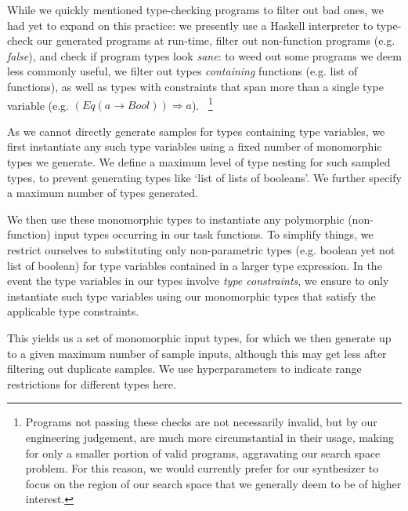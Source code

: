 \documentclass{article}
\begin{document}
While we quickly mentioned type-checking programs to filter out bad ones,
we had yet to expand on this practice:
we presently use a Haskell interpreter to type-check our generated programs at run-time,
filter out non-function programs (e.g. \emph{false}),
and check if program types look \emph{sane}:
to weed out some programs we deem less commonly useful,
we filter out types \emph{containing} functions (e.g. list of functions),
as well as types with constraints that span more than a single type variable (e.g. $(Eq (a \rightarrow Bool)) \Rightarrow a$).%
~\footnote{
    Programs not passing these checks are not necessarily invalid,
    but by our engineering judgement,
    are much more circumstantial in their usage,
    making for only a smaller portion of valid programs,
    aggravating our search space problem.
    For this reason, we would currently prefer for our synthesizer to focus on
    the region of our search space that we generally deem to be of higher interest.
}

As we cannot directly generate samples for types containing type variables,
we first instantiate any such type variables using a fixed number of monomorphic types we generate.
We define a
maximum level of type nesting for such sampled types,
to prevent generating types like `list of lists of booleans'.
We further specify a maximum number of types generated.

We then use these monomorphic types to instantiate any polymorphic
(non-function) input types occurring in our task functions.
To simplify things, we restrict ourselves to substituting only non-parametric types (e.g. boolean yet not list of boolean) for type variables contained in a larger type expression.
In the event the type variables in our types involve \emph{type constraints},
we ensure to only instantiate such type variables using our monomorphic types that satisfy the applicable type constraints.

This yields us a set of monomorphic input types,
for which we then generate up to a given maximum number of sample inputs,
although this may get less after filtering out duplicate samples.
We use hyperparameters to indicate range restrictions for different types here.
\end{document}
